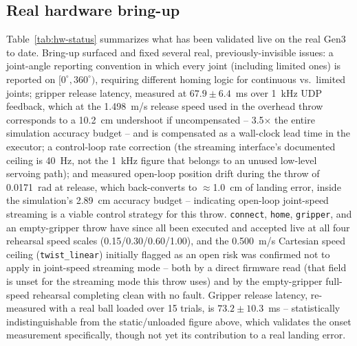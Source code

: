 \documentclass[conference]{IEEEtran}
\begin{document}
\subsection{Real hardware bring-up}
\label{sec:results-hw}
Table~\ref{tab:hw-status} summarizes what has been validated live on the
real Gen3 to date. Bring-up surfaced and fixed several real,
previously-invisible issues: a joint-angle reporting convention in which
every joint (including limited ones) is reported on $[0^\circ,360^\circ)$,
requiring different homing logic for continuous vs.\ limited joints;
gripper release latency, measured at $67.9\pm6.4$~ms over 1~kHz UDP
feedback, which at the 1.498~m/s release speed used in the overhead throw
corresponds to a 10.2~cm undershoot if uncompensated -- 3.5$\times$ the
entire simulation accuracy budget -- and is compensated as a wall-clock
lead time in the executor; a control-loop rate correction (the streaming
interface's documented ceiling is 40~Hz, not the 1~kHz figure that belongs
to an unused low-level servoing path); and measured open-loop position
drift during the throw of 0.0171~rad at release, which back-converts to
$\approx$1.0~cm of landing error, inside the simulation's 2.89~cm accuracy
budget -- indicating open-loop joint-speed streaming is a viable control
strategy for this throw. \texttt{connect}, \texttt{home}, \texttt{gripper},
and an empty-gripper throw have since all been executed and accepted live
at all four rehearsal speed scales (0.15/0.30/0.60/1.00), and the
0.500~m/s Cartesian speed ceiling (\texttt{twist\_linear}) initially flagged
as an open risk was confirmed not to apply in joint-speed streaming mode --
both by a direct firmware read (that field is unset for the streaming mode
this throw uses) and by the empty-gripper full-speed rehearsal completing
clean with no fault. Gripper release latency, re-measured with a real ball
loaded over 15 trials, is $73.2\pm10.3$~ms -- statistically indistinguishable
from the static/unloaded figure above, which validates the onset
measurement specifically, though not yet its contribution to a real landing
error.
\end{document}
